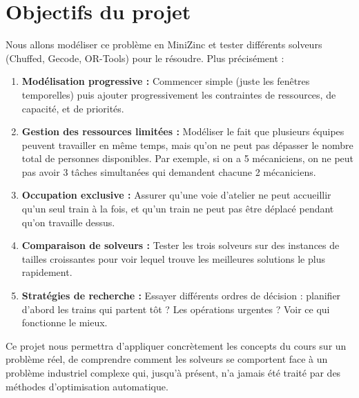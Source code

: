 \section*{Objectifs du projet}

Nous allons modéliser ce problème en MiniZinc et tester différents solveurs (Chuffed, Gecode, OR-Tools) pour le résoudre.
Plus précisément :

\begin{enumerate}
	\item \textbf{Modélisation progressive :}
	      Commencer simple (juste les fenêtres temporelles) puis ajouter progressivement les contraintes de ressources, de capacité, et de priorités.

	\item \textbf{Gestion des ressources limitées :}
	      Modéliser le fait que plusieurs équipes peuvent travailler en même temps,
	      mais qu'on ne peut pas dépasser le nombre total de personnes disponibles.
	      Par exemple, si on a 5 mécaniciens, on ne peut pas avoir 3 tâches simultanées qui demandent chacune 2 mécaniciens.

	\item \textbf{Occupation exclusive :}
	      Assurer qu'une voie d'atelier ne peut accueillir qu'un seul train à la fois,
	      et qu'un train ne peut pas être déplacé pendant qu'on travaille dessus.

	\item \textbf{Comparaison de solveurs :}
	      Tester les trois solveurs sur des instances de tailles croissantes pour voir lequel trouve les meilleures solutions le plus rapidement.

	\item \textbf{Stratégies de recherche :}
	      Essayer différents ordres de décision : planifier d'abord les trains qui partent tôt ? Les opérations urgentes ? Voir ce qui fonctionne le mieux.
\end{enumerate}

Ce projet nous permettra d'appliquer concrètement les concepts du cours sur un problème réel,
de comprendre comment les solveurs se comportent face à un problème industriel complexe qui,
jusqu'à présent, n'a jamais été traité par des méthodes d'optimisation automatique.
